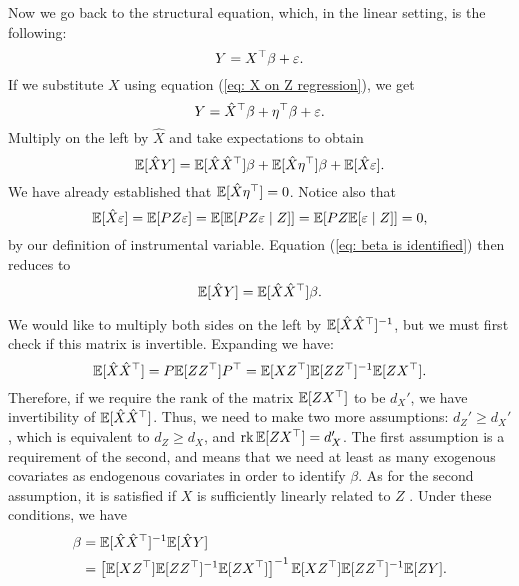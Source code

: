 Now we go back to the structural equation, which, in the linear setting, is the following:
\begin{equation}
    \label{eq: linear structural equation}
    Y = X^{ \top }\beta + \varepsilon
.\end{equation}
If we substitute $ X $ using equation (\ref{eq: X on Z regression}), we get
\begin{equation*}
    Y = \hat{ X }^{ \top } \beta + \eta^{ \top } \beta + \varepsilon
.\end{equation*}
Multiply on the left by $ \hat{ X } $ and take expectations to obtain
\begin{equation}
    \label{eq: beta is identified}
    \mathbb{E} [ \hat{ X } Y ] = \mathbb{E} [ \hat{ X } \hat{ X }^{ \top } ] \beta + \mathbb{E} [ \hat{ X } \eta^{ \top } ] \beta + \mathbb{E} [ \hat{ X } \varepsilon ]
.\end{equation}
We have already established that $ \mathbb{E} [ \hat{ X } \eta^{ \top } ] = 0 $.
Notice also that
\begin{equation*}
    \mathbb{E} [ \hat{ X } \varepsilon ]
    = \mathbb{E} [ PZ \varepsilon ]
    = \mathbb{E} [ \mathbb{E} [ PZ \varepsilon \mid Z ] ]
    = \mathbb{E} [ PZ \mathbb{E} [ \varepsilon \mid Z ] ]
    = 0
,\end{equation*}
by our definition of instrumental variable.
Equation (\ref{eq: beta is identified}) then reduces to
\begin{equation*}
    \mathbb{E} [ \hat{ X } Y ] = \mathbb{E} [ \hat{ X } \hat{ X }^{ \top } ] \beta
.\end{equation*}

We would like to multiply both sides on the left by $ \mathbb{E} [ \hat{ X } \hat{ X }^{ \top } ]^{ -1 } $, but we must first check if this matrix is invertible.
Expanding we have:
\begin{equation*}
    \mathbb{E} [ \hat{ X } \hat{ X }^{ \top } ]
    = P \mathbb{E} [ Z Z^{ \top } ] P^{ \top }
    = \mathbb{E} [ X Z^{ \top } ] \mathbb{E} [ Z Z^{ \top } ]^{ -1 } \mathbb{E} [ Z X^{ \top } ]
.\end{equation*}
Therefore, if we require the rank of the matrix $ \mathbb{E} [ Z X^{ \top } ] $ to be $ d_{ X }' $, we have invertibility of $ \mathbb{E} [ \hat{ X } \hat{ X }^{ \top } ] $.
Thus, we need to make two more assumptions: $ d_{ Z }' \geq d_{ X }' $, which is equivalent to $ d_{ Z } \geq d_{ X } $, and $ \operatorname{rk} \mathbb{E} [ Z X^{ \top } ] = d_{ X }' $.
The first assumption is a requirement of the second, and means that we need at least as many exogenous covariates as endogenous covariates in order to identify $ \beta $.
As for the second assumption, it is satisfied if $ X $ is sufficiently linearly related to $ Z $ \cite{wooldridge2001}. Under these conditions, we have
\begin{align}
    \label{eq: beta reduced}
    \beta
    &= \mathbb{E} [ \hat{ X } \hat{ X }^{ \top } ]^{ -1 } \mathbb{E} [ \hat{ X } Y ] \\
    &= \left[
        \mathbb{E} [ X Z^{ \top } ] \mathbb{E} [ Z Z^{ \top } ]^{ -1 } \mathbb{E} [ Z X^{ \top } ]
    \right]^{ -1 }
    \mathbb{E} [ X Z^{ \top } ] \mathbb{E} [ Z Z^{ \top } ]^{ -1 } \mathbb{E} [ Z Y ] \label{eq: beta expanded}
.\end{align}

